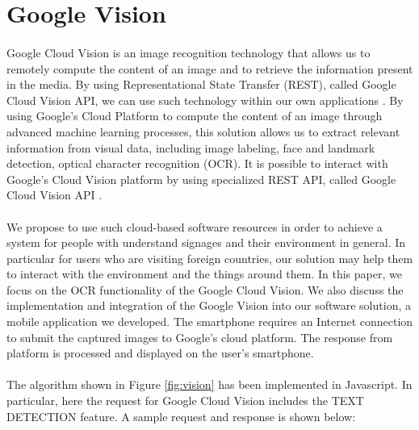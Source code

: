 \documentclass[12pt]{article}
\begin{document}
\section{Google Vision}
\label{vision}
\paragraph{}Google Cloud Vision is an image recognition technology that allows us to remotely compute the content of an image and to retrieve the information present in the media. By using Representational State Transfer (REST), called Google Cloud Vision API, we can use such technology within our own applications \cite{vision}. By using Google’s Cloud Platform to compute the content of an image through advanced machine learning processes, this solution allows us to extract relevant information from visual data, including image labeling, face and landmark detection, optical character recognition (OCR). It is possible to interact with Google’s Cloud Vision platform by using specialized REST API, called Google Cloud Vision API \cite{vision}.

\paragraph{}We propose to use such cloud-based software resources in order to achieve a system for people with understand signages and their environment in general. In particular for users who are visiting foreign countries, our solution may help them to interact with the environment and the things around them. In this paper, we focus on the OCR functionality of the Google Cloud Vision. We also discuss the implementation and integration of the Google Vision into our software solution, a mobile application we developed. The smartphone requires an Internet connection to submit the captured images to Google’s cloud platform. The response from platform is processed and displayed on the user's smartphone.

\paragraph{}The algorithm shown in Figure \ref{fig:vision} has been implemented in Javascript. In particular, here the request for Google Cloud Vision includes the TEXT DETECTION feature. A sample request and response is shown below:
\end{document}
